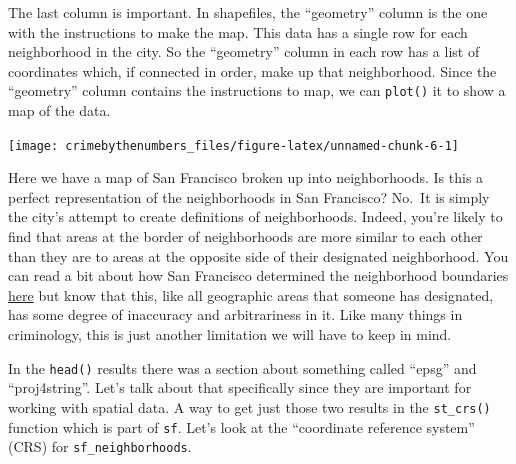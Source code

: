 \documentclass[
  12pt,
]{book}
\newenvironment{Shaded}{\begin{snugshade}}{\end{snugshade}}
\newcommand{\KeywordTok}[1]{\textcolor[rgb]{0.27,0.27,0.27}{\textbf{#1}}}
\newcommand{\NormalTok}[1]{#1}
\newcommand{\OperatorTok}[1]{\textcolor[rgb]{0.43,0.43,0.43}{\textbf{#1}}}
\begin{document}
The last column is important. In shapefiles, the ``geometry'' column is the one with the instructions to make the map. This data has a single row for each neighborhood in the city. So the ``geometry'' column in each row has a list of coordinates which, if connected in order, make up that neighborhood. Since the ``geometry'' column contains the instructions to map, we can \texttt{plot()} it to show a map of the data.

\begin{Shaded}
\end{Shaded}

\begin{center}\texttt{[image: crimebythenumbers\_files/figure-latex/unnamed-chunk-6-1]} \end{center}

Here we have a map of San Francisco broken up into neighborhoods. Is this a perfect representation of the neighborhoods in San Francisco? No.~It is simply the city's attempt to create definitions of neighborhoods. Indeed, you're likely to find that areas at the border of neighborhoods are more similar to each other than they are to areas at the opposite side of their designated neighborhood. You can read a bit about how San Francisco determined the neighborhood boundaries \href{https://data.sfgov.org/Geographic-Locations-and-Boundaries/Analysis-Neighborhoods/p5b7-5n3h}{here} but know that this, like all geographic areas that someone has designated, has some degree of inaccuracy and arbitrariness in it. Like many things in criminology, this is just another limitation we will have to keep in mind.

In the \texttt{head()} results there was a section about something called ``epsg'' and ``proj4string''. Let's talk about that specifically since they are important for working with spatial data. A way to get just those two results in the \texttt{st\_crs()} function which is part of \texttt{sf}. Let's look at the ``coordinate reference system'' (CRS) for \texttt{sf\_neighborhoods}.
\end{document}
